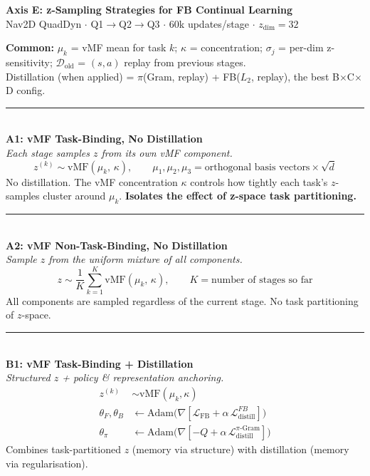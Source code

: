 \documentclass[10pt]{article}
\newcommand{\loss}{\mathcal{L}}
\newcommand{\Dold}{\mathcal{D}_{\text{old}}}
\newcommand{\method}[2]{%
  \noindent\rule{\textwidth}{0.5pt}\\[2pt]
  {\large\textbf{#1}}\\[2pt]
  \textit{#2}\\[3pt]
}
\begin{document}
\begin{center}
{\Large\textbf{Axis E: z-Sampling Strategies for FB Continual Learning}}\\[4pt]
{\small Nav2D QuadDyn $\cdot$ Q1$\to$Q2$\to$Q3 $\cdot$ 60k updates/stage $\cdot$ $z_{\text{dim}}=32$}
\end{center}

\noindent\textbf{Common:}\;
$\mu_k$ = vMF mean for task $k$;\;
$\kappa$ = concentration;\;
$\sigma_j$ = per-dim z-sensitivity;\;
$\Dold$ = $(s,a)$ replay from previous stages.\\
Distillation (when applied) = $\pi$(Gram, replay) + FB($L_2$, replay), the best B$\times$C$\times$D config.

\method{A1: vMF Task-Binding, No Distillation}{Each stage samples $z$ from its own vMF component.}
\vspace{-0.5em}
\[
z^{(k)} \sim \mathrm{vMF}(\mu_k,\, \kappa), \qquad
\mu_1, \mu_2, \mu_3 = \text{orthogonal basis vectors} \times \sqrt{d}
\]
No distillation. The vMF concentration $\kappa$ controls how tightly each task's $z$-samples cluster around $\mu_k$. \textbf{Isolates the effect of z-space task partitioning.}

\method{A2: vMF Non-Task-Binding, No Distillation}{Sample $z$ from the uniform mixture of all components.}
\vspace{-0.5em}
\[
z \sim \frac{1}{K}\sum_{k=1}^{K} \mathrm{vMF}(\mu_k,\, \kappa), \qquad K = \text{number of stages so far}
\]
All components are sampled regardless of the current stage. No task partitioning of $z$-space.

\method{B1: vMF Task-Binding + Distillation}{Structured $z$ + policy \& representation anchoring.}
\vspace{-0.5em}
\begin{align*}
z^{(k)} &\sim \mathrm{vMF}(\mu_k, \kappa) \\
\theta_F, \theta_B &\leftarrow \mathrm{Adam}\bigl(\nabla[\loss_{\text{FB}} + \alpha\,\loss_{\text{distill}}^{FB}]\bigr) \\
\theta_\pi &\leftarrow \mathrm{Adam}\bigl(\nabla[-Q + \alpha\,\loss_{\text{distill}}^{\pi\text{-Gram}}]\bigr)
\end{align*}
Combines task-partitioned $z$ (memory via structure) with distillation (memory via regularisation).
\end{document}
